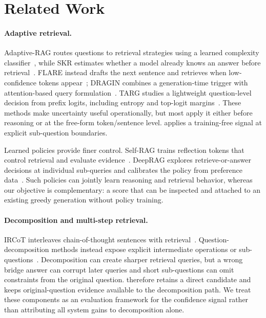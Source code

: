 \section{Related Work}
\label{sec:related}

\paragraph{Adaptive retrieval.}
Adaptive-RAG routes questions to retrieval strategies using a learned
complexity classifier~\citep{adaptiverag}, while SKR estimates whether a model
already knows an answer before retrieval~\citep{skr}. FLARE instead drafts the
next sentence and retrieves when low-confidence tokens appear~\citep{flare};
DRAGIN combines a generation-time trigger with attention-based query
formulation~\citep{dragin}. TARG studies a lightweight question-level decision
from prefix logits, including entropy and top-logit margins~\citep{targ}.
These methods make uncertainty useful operationally, but most apply it either
before reasoning or at the free-form token/sentence level. \method{} applies a
training-free signal at explicit sub-question boundaries.

Learned policies provide finer control. Self-RAG trains reflection tokens that
control retrieval and evaluate evidence~\citep{selfrag}. DeepRAG explores
retrieve-or-answer decisions at individual sub-queries and calibrates the
policy from preference data~\citep{deeprag}. Such policies can jointly learn
reasoning and retrieval behavior, whereas our objective is complementary: a
score that can be inspected and attached to an existing greedy generation
without policy training.

\paragraph{Decomposition and multi-step retrieval.}
IRCoT interleaves chain-of-thought sentences with retrieval~\citep{ircot}.
Question-decomposition methods instead expose explicit intermediate
operations or sub-questions~\citep{decomprc,break_qdmr}. Decomposition can
create sharper retrieval queries, but a wrong bridge answer can corrupt later
queries and short sub-questions can omit constraints from the original
question. \method{} therefore retains a direct candidate and keeps
original-question evidence available to the decomposition path. We treat these
components as an evaluation framework for the confidence signal rather than
attributing all system gains to decomposition alone.

